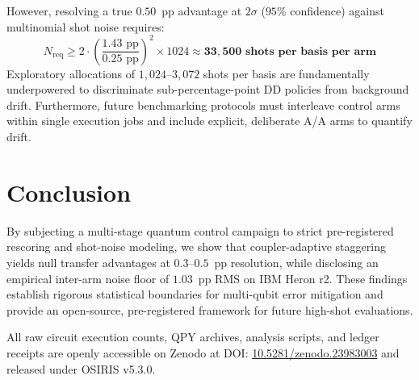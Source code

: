 \documentclass[aps,prl,twocolumn,amsmath,amssymb,superscriptaddress,floatfix]{revtex4-2}
\begin{document}
However, resolving a true $0.50$~pp advantage at $2\sigma$ ($95\%$ confidence) against multinomial shot noise requires:
\begin{equation}
N_{\text{req}} \ge 2 \cdot \left(\frac{1.43\text{ pp}}{0.25\text{ pp}}\right)^2 \times 1024 \approx \mathbf{33,500\text{ shots per basis per arm}}
\end{equation}
Exploratory allocations of $1{,}024\text{--}3{,}072$ shots per basis are fundamentally underpowered to discriminate sub-percentage-point DD policies from background drift. Furthermore, future benchmarking protocols must interleave control arms within single execution jobs and include explicit, deliberate A/A arms to quantify drift.

\section{Conclusion}
By subjecting a multi-stage quantum control campaign to strict pre-registered rescoring and shot-noise modeling, we show that coupler-adaptive staggering yields null transfer advantages at $0.3\text{--}0.5$~pp resolution, while disclosing an empirical inter-arm noise floor of $1.03$~pp RMS on IBM Heron r2. These findings establish rigorous statistical boundaries for multi-qubit error mitigation and provide an open-source, pre-registered framework for future high-shot evaluations.

All raw circuit execution counts, QPY archives, analysis scripts, and ledger receipts are openly accessible on Zenodo at DOI: \href{https://doi.org/10.5281/zenodo.23983003}{10.5281/zenodo.23983003} and released under OSIRIS v5.3.0.
\end{document}
